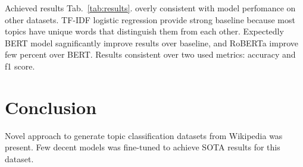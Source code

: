 \documentclass{article}
\begin{document}
Achieved results Tab.~\ref{tab:results}. overly consistent with model perfomance on other datasets. TF-IDF logistic regression provide strong baseline because most topics have unique words that distinguish them from each other. Expectedly BERT model sagnificantly improve results over baseline, and RoBERTa improve
few percent over BERT. Results consistent over two used metrics: accuracy and f1 score.

\section{Conclusion}
Novel approach to generate topic classification datasets from Wikipedia was present. Few decent models was fine-tuned to achieve SOTA results for this dataset.



\end{document}
